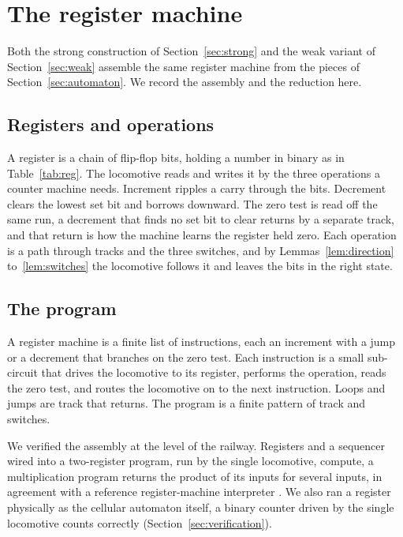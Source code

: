 \section{The register machine}
\label{sec:universality}

Both the strong construction of Section~\ref{sec:strong} and the weak variant of Section~\ref{sec:weak}
assemble the same register machine from the pieces of Section~\ref{sec:automaton}. We record the assembly and
the reduction here.

\subsection{Registers and operations}

A register is a chain of flip-flop bits, holding a number in binary as in Table~\ref{tab:reg}. The locomotive
reads and writes it by the three operations a counter machine needs. Increment ripples a carry through the
bits. Decrement clears the lowest set bit and borrows downward. The zero test is read off the same run, a
decrement that finds no set bit to clear returns by a separate track, and that return is how the machine learns
the register held zero. Each operation is a path through tracks and the three switches, and by
Lemmas~\ref{lem:direction} to~\ref{lem:switches} the locomotive follows it and leaves the bits in the right
state.

\subsection{The program}

A register machine is a finite list of instructions, each an increment with a jump or a decrement that branches
on the zero test. Each instruction is a small sub-circuit that drives the locomotive to its register, performs
the operation, reads the zero test, and routes the locomotive on to the next instruction. Loops and jumps are
track that returns. The program is a finite pattern of track and switches.

We verified the assembly at the level of the railway. Registers and a sequencer wired into a two-register
program, run by the single locomotive, compute, a multiplication program returns the product of its inputs for
several inputs, in agreement with a reference register-machine interpreter \cite{pollard2026vibe}. We also ran a
register physically as the cellular automaton itself, a binary counter driven by the single locomotive counts
correctly (Section~\ref{sec:verification}).

